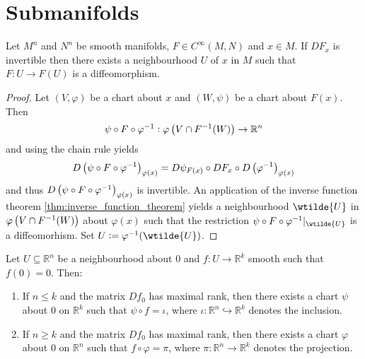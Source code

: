 \section*{Submanifolds}

\begin{proposition}
	\label{prop:inverse_function_theorem_for_manifolds}
	Let $M^n$ and $N^n$ be smooth manifolds, $F \in C^\infty(M,N)$ and $x \in M$. If $DF_x$ is invertible then there exists a neighbourhood $U$ of $x$ in $M$ such that $F : U \to F(U)$ is a diffeomorphism.
\end{proposition}

\begin{proof}
	Let $(V,\varphi)$ be a chart about $x$ and $(W,\psi)$ be a chart about $F(x)$. Then 
	\begin{equation*}
		\psi \circ F \circ \varphi^{-1} : \varphi\del[1]{V \cap F^{-1}(W)} \to \mathbb{R}^n
	\end{equation*}
	\noindent and using the chain rule yields
	\begin{equation*}
		D\del[1]{\psi \circ F \circ \varphi^{-1}}_{\varphi(x)} = D\psi_{F(x)} \circ DF_x \circ D\del[1]{\varphi^{-1}}_{\varphi(x)}
	\end{equation*}
	\noindent and thus $D\del[1]{\psi \circ F \circ \varphi^{-1}}_{\varphi(x)}$ is invertible. An application of the inverse function theorem \ref{thm:inverse_function_theorem} yields a neighbourhood $\wtilde{U}$ in $\varphi\del[1]{V \cap F^{-1}(W)}$ about $\varphi(x)$ such that the restriction $\psi \circ F \circ \varphi^{-1}\vert_{\wtilde{U}}$ is a diffeomorhism. Set $U := \varphi^{-1}(\wtilde{U})$. 
\end{proof}

\begin{proposition}
	Let $U \subseteq \mathbb{R}^n$ be a neighbourhood about $0$ and $f : U \to \mathbb{R}^k$ smooth such that $f(0) = 0$. Then:
	\begin{enumerate}[label=\textup{(\alph*)},leftmargin=*]
		\item If $n \leq k$ and the matrix $Df_0$ has maximal rank, then there exists a chart $\psi$ about $0$ on $\mathbb{R}^k$ such that $\psi \circ f = \iota$, where $\iota : \mathbb{R}^n \hookrightarrow \mathbb{R}^k$ denotes the inclusion.
		\item If $n \geq k$ and the matrix $Df_0$ has maximal rank, then there exists a chart $\varphi$ about $0$ on $\mathbb{R}^n$ such that $f \circ \varphi = \pi$, where $\pi : \mathbb{R}^n \to \mathbb{R}^k$ denotes the projection.
	\end{enumerate}
\end{proposition}

